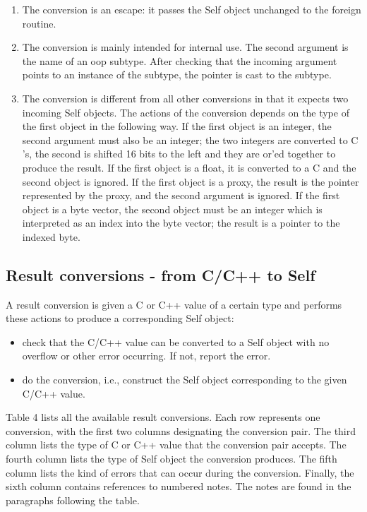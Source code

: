 \documentclass[letterpaper,10pt,english]{sphinxmanual}
\begin{document}
\begin{enumerate}
\item {} 
The  conversion is an escape: it passes the Self object unchanged to the foreign routine.

\item {} 
The  conversion is mainly intended for internal use. The second argument is the name of
an oop subtype. After checking that the incoming argument points to an instance of the subtype,
the pointer is cast to the subtype.

\item {} 
The  conversion is different from all other conversions in that it expects two incoming
Self objects. The actions of the conversion depends on the type of the first object in the following
way. If the first object is an integer, the second argument must also be an integer; the two integers
are converted to C ’s, the second is shifted 16 bits to the left and they are or’ed together to produce
the result. If the first object is a float, it is converted to a C  and the second object is
ignored. If the first object is a proxy, the result is the pointer represented by the proxy, and the second
argument is ignored. If the first object is a byte vector, the second object must be an integer
which is interpreted as an index into the byte vector; the result is a pointer to the indexed byte.

\end{enumerate}


\subsection{Result conversions - from C/C++ to Self}
\label{vmref:index-88}\label{vmref:result-conversions-from-c-c-to-self}
A result conversion is given a C or C++ value of a certain type and performs these actions to produce
a corresponding Self object:
\begin{itemize}
\item {} 
check that the C/C++ value can be converted to a Self object with no overflow or other error
occurring. If not, report the error.

\item {} 
do the conversion, i.e., construct the Self object corresponding to the given C/C++ value.

\end{itemize}

Table 4 lists all the available result conversions. Each row represents one conversion, with the first
two columns designating the conversion pair. The third column lists the type of C or C++ value that
the conversion pair accepts. The fourth column lists the type of Self object the conversion produces.
The fifth column lists the kind of errors that can occur during the conversion. Finally, the sixth
column contains references to numbered notes. The notes are found in the paragraphs following
the table.
\end{document}
